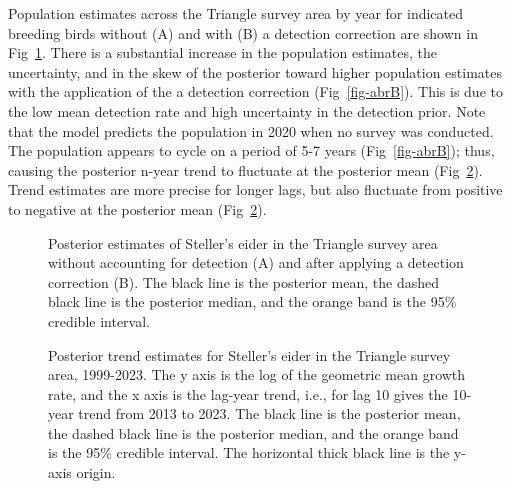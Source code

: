 \documentclass[
  10pt,
  letterpaper,
]{article}
\begin{document}
Population estimates across the Triangle survey area by year for
indicated breeding birds without (A) and with (B) a detection correction
are shown in Fig~\ref{fig-yearABR}. There is a substantial increase in
the population estimates, the uncertainty, and in the skew of the
posterior toward higher population estimates with the application of the
a detection correction (Fig~\ref{fig-abrB}). This is due to the low mean
detection rate and high uncertainty in the detection prior. Note that
the model predicts the population in 2020 when no survey was conducted.
The population appears to cycle on a period of 5-7 years
(Fig~\ref{fig-abrB}); thus, causing the posterior n-year trend to
fluctuate at the posterior mean (Fig~\ref{fig-trendABR}). Trend
estimates are more precise for longer lags, but also fluctuate from
positive to negative at the posterior mean (Fig~\ref{fig-trendABR}).

\begin{figure}

\begin{minipage}{\linewidth}

\subcaption{\label{fig-abrA}}

\end{minipage}%
\newline
\begin{minipage}{\linewidth}

\subcaption{\label{fig-abrB}}

\end{minipage}%

\caption{\label{fig-yearABR}Posterior estimates of Steller's eider in
the Triangle survey area without accounting for detection (A) and after
applying a detection correction (B). The black line is the posterior
mean, the dashed black line is the posterior median, and the orange band
is the 95\% credible interval.}

\end{figure}%

\begin{figure}

\caption{\label{fig-trendABR}Posterior trend estimates for Steller's
eider in the Triangle survey area, 1999-2023. The y axis is the log of
the geometric mean growth rate, and the x axis is the lag-year trend,
i.e., for lag 10 gives the 10-year trend from 2013 to 2023. The black
line is the posterior mean, the dashed black line is the posterior
median, and the orange band is the 95\% credible interval. The
horizontal thick black line is the y-axis origin.}

\end{figure}%
\end{document}
